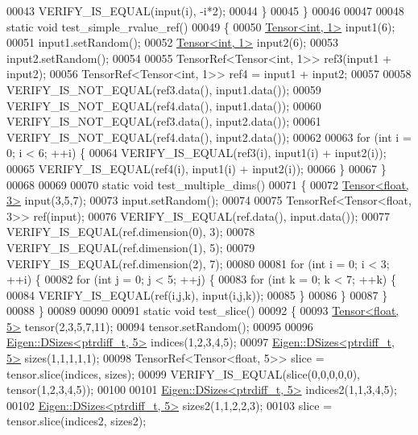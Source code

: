 \begin{DoxyCode}
00043     VERIFY\_IS\_EQUAL(input(i), -i*2);
00044   \}
00045 \}
00046 
00047 
00048 \textcolor{keyword}{static} \textcolor{keywordtype}{void} test\_simple\_rvalue\_ref()
00049 \{
00050   \hyperlink{class_eigen_1_1_tensor}{Tensor<int, 1>} input1(6);
00051   input1.setRandom();
00052   \hyperlink{class_eigen_1_1_tensor}{Tensor<int, 1>} input2(6);
00053   input2.setRandom();
00054 
00055   TensorRef<Tensor<int, 1>> ref3(input1 + input2);
00056   TensorRef<Tensor<int, 1>> ref4 = input1 + input2;
00057 
00058   VERIFY\_IS\_NOT\_EQUAL(ref3.data(), input1.data());
00059   VERIFY\_IS\_NOT\_EQUAL(ref4.data(), input1.data());
00060   VERIFY\_IS\_NOT\_EQUAL(ref3.data(), input2.data());
00061   VERIFY\_IS\_NOT\_EQUAL(ref4.data(), input2.data());
00062 
00063   \textcolor{keywordflow}{for} (\textcolor{keywordtype}{int} i = 0; i < 6; ++i) \{
00064     VERIFY\_IS\_EQUAL(ref3(i), input1(i) + input2(i));
00065     VERIFY\_IS\_EQUAL(ref4(i), input1(i) + input2(i));
00066   \}
00067 \}
00068 
00069 
00070 \textcolor{keyword}{static} \textcolor{keywordtype}{void} test\_multiple\_dims()
00071 \{
00072   \hyperlink{class_eigen_1_1_tensor}{Tensor<float, 3>} input(3,5,7);
00073   input.setRandom();
00074 
00075   TensorRef<Tensor<float, 3>> ref(input);
00076   VERIFY\_IS\_EQUAL(ref.data(), input.data());
00077   VERIFY\_IS\_EQUAL(ref.dimension(0), 3);
00078   VERIFY\_IS\_EQUAL(ref.dimension(1), 5);
00079   VERIFY\_IS\_EQUAL(ref.dimension(2), 7);
00080 
00081   \textcolor{keywordflow}{for} (\textcolor{keywordtype}{int} i = 0; i < 3; ++i) \{
00082     \textcolor{keywordflow}{for} (\textcolor{keywordtype}{int} j = 0; j < 5; ++j) \{
00083       \textcolor{keywordflow}{for} (\textcolor{keywordtype}{int} k = 0; k < 7; ++k) \{
00084         VERIFY\_IS\_EQUAL(ref(i,j,k), input(i,j,k));
00085       \}
00086     \}
00087   \}
00088 \}
00089 
00090 
00091 \textcolor{keyword}{static} \textcolor{keywordtype}{void} test\_slice()
00092 \{
00093   \hyperlink{class_eigen_1_1_tensor}{Tensor<float, 5>} tensor(2,3,5,7,11);
00094   tensor.setRandom();
00095 
00096   \hyperlink{struct_eigen_1_1_d_sizes}{Eigen::DSizes<ptrdiff\_t, 5>} indices(1,2,3,4,5);
00097   \hyperlink{struct_eigen_1_1_d_sizes}{Eigen::DSizes<ptrdiff\_t, 5>} sizes(1,1,1,1,1);
00098   TensorRef<Tensor<float, 5>> slice = tensor.slice(indices, sizes);
00099   VERIFY\_IS\_EQUAL(slice(0,0,0,0,0), tensor(1,2,3,4,5));
00100 
00101   \hyperlink{struct_eigen_1_1_d_sizes}{Eigen::DSizes<ptrdiff\_t, 5>} indices2(1,1,3,4,5);
00102   \hyperlink{struct_eigen_1_1_d_sizes}{Eigen::DSizes<ptrdiff\_t, 5>} sizes2(1,1,2,2,3);
00103   slice = tensor.slice(indices2, sizes2);

\end{DoxyCode}
